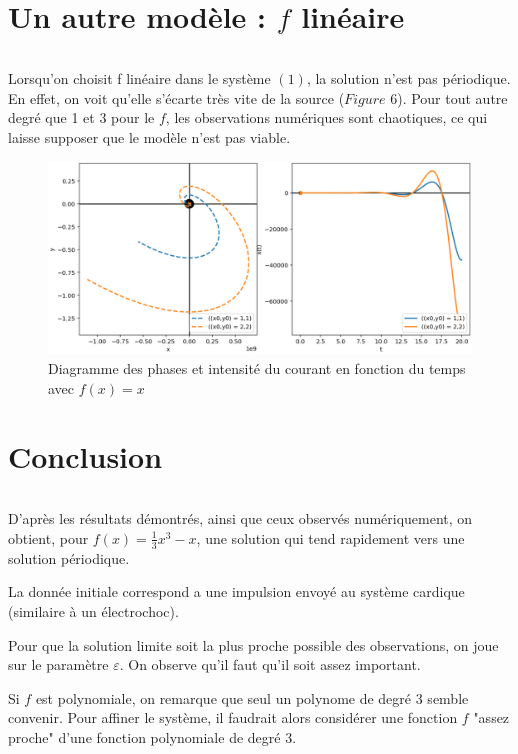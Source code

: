 \documentclass{article}
\begin{document}
\section{Un autre modèle : $f$ linéaire}

\[\]

Lorsqu'on choisit f linéaire dans le système $(1)$, la solution n'est pas périodique.
En effet, on voit qu'elle s'écarte très vite de la source ($Figure$ 6).
Pour tout autre degré que 1 et 3 pour le $f$, les observations numériques sont chaotiques, ce qui laisse supposer que le modèle n'est pas viable. 

\begin{figure}[H]
    \centering
    \includegraphics[scale=0.3]{../images/diff_f.png}
    \captionsetup{justification=centering,margin=2cm}
    \caption{Diagramme des phases et intensité du courant en fonction du temps avec $f(x) = x$ }
\end{figure}

\section{Conclusion}

\[\]

D'après les résultats démontrés, ainsi que ceux observés numériquement, on obtient, pour 
\(f(x) = \frac{1}{3} x^3 - x\), une solution qui tend rapidement vers une solution périodique.

\smallskip

La donnée initiale correspond a une impulsion envoyé au système cardique (similaire à un électrochoc).

\smallskip

Pour que la solution limite soit la plus proche possible des observations, on joue sur le paramètre $\varepsilon$.
On observe qu'il faut qu'il soit assez important.

\smallskip

Si $f$ est polynomiale, on remarque que seul un polynome de degré 3 semble convenir.
Pour affiner le système, il faudrait alors considérer une fonction $f$ "assez proche" d'une fonction 
polynomiale de degré 3.
\end{document}
